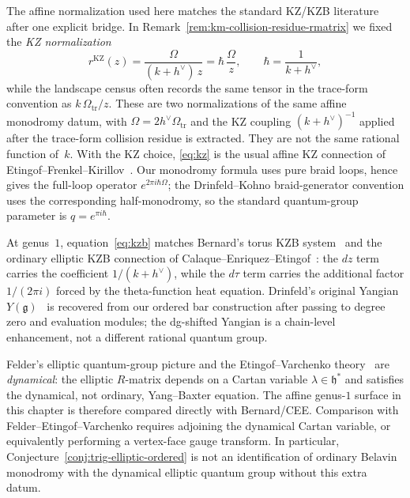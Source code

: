 \begin{remark}[EF comparison]
\label{rem:ef-comparison}
The affine normalization used here matches the standard KZ/KZB
literature after one explicit bridge. In
Remark~\ref{rem:km-collision-residue-rmatrix} we fixed the
\emph{KZ normalization}
\[
r^{\mathrm{KZ}}(z) = \frac{\Omega}{(k+h^\vee)\,z}
= \hbar\,\frac{\Omega}{z},
\qquad
\hbar = \frac{1}{k+h^\vee},
\]
while the landscape census often records the same tensor in the
trace-form convention as $k\,\Omega_{\mathrm{tr}}/z$. These are two
normalizations of the same affine monodromy datum, with
$\Omega=2h^\vee\Omega_{\mathrm{tr}}$ and the KZ coupling
$(k+h^\vee)^{-1}$ applied after the trace-form collision residue is
extracted. They are not the same rational function of~$k$. With the
KZ choice,
\eqref{eq:kz} is the usual affine KZ connection of
Etingof--Frenkel--Kirillov~\cite[Ch.~1]{EFK98}. Our monodromy formula
uses pure braid loops, hence gives the full-loop operator
$e^{2\pi i\hbar\Omega}$; the Drinfeld--Kohno braid-generator
convention uses the corresponding half-monodromy, so the standard
quantum-group parameter is $q = e^{\pi i\hbar}$.

At genus~$1$, equation~\eqref{eq:kzb} matches Bernard's torus KZB
system~\cite[\S\S3--4]{Bernard88} and the ordinary elliptic KZB
connection of Calaque--Enriquez--Etingof~\cite[Prop.~6.6]{CEE09}:
the $dz$ term carries the coefficient $1/(k+h^\vee)$, while the
$d\tau$ term carries the additional factor $1/(2\pi i)$ forced by the
theta-function heat equation. Drinfeld's original Yangian
$Y(\mathfrak{g})$~\cite{Drinfeld85} is recovered from our ordered bar
construction after passing to degree zero and evaluation modules; the
dg-shifted Yangian is a chain-level enhancement, not a different
rational quantum group.

Felder's elliptic quantum-group picture and the
Etingof--Varchenko theory~\cite{Felder94,EV98} are \emph{dynamical}:
the elliptic $R$-matrix depends on a Cartan variable
$\lambda \in \mathfrak{h}^*$ and satisfies the dynamical, not
ordinary, Yang--Baxter equation. The affine genus-$1$ surface in this
chapter is therefore compared directly with Bernard/CEE.
Comparison with Felder--Etingof--Varchenko requires adjoining the
dynamical Cartan variable, or equivalently performing a vertex-face
gauge transform. In particular,
Conjecture~\ref{conj:trig-elliptic-ordered} is not an identification
of ordinary Belavin monodromy with the dynamical elliptic quantum
group without this extra datum.
\end{remark}

